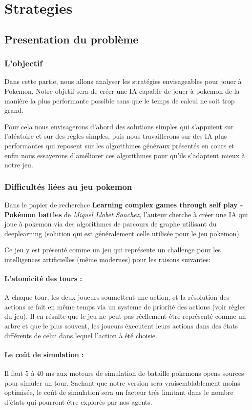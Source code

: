 \section{Strategies}
    \bigskip
	\subsection{Presentation du problème}
		\subsubsection{L'objectif}
			Dans cette partie, nous allons analyser les stratégies envisageables pour jouer à Pokemon. Notre objetif sera de créer une IA capable de jouer à pokemon de la 						manière la plus performante possible sans que le temps de calcul ne soit trop grand.

			Pour cela nous envisagerons d'abord des solutions simples qui s'appuient sur l'aléatoire et sur des règles simples, puis nous travaillerons sur des IA plus performantes 					qui reposent sur les algorithmes généraux présentés en cours et enfin nous essayerons d'améliorer ces algorithmes pour qu'ils s'adaptent mieux à notre jeu.
		\subsubsection{Difficultés liées au jeu pokemon}
			Dans le papier de recherchce \textbf{Learning complex games through self play - Pokémon battles} de \emph{Miquel Llobet Sanchez}, l'auteur cherche à créer une IA 					qui joue à pokemon via des algorithmes de parcours de graphe utilisant du deeplearning (solution qui est généralement celle utilisée pour le jeu pokemon).

			Ce jeu y est présenté comme un jeu qui représente un challenge pour les intelligences artificielles (même modernes) pour les raisons suivantes:
			\paragraph{L'atomicité des tours :}
				A chaque tour, les deux joueurs soumettent une action, et la résolution des actions se fait en même temps via un systeme de priorité des actions (voir règles 						du jeu). Il en résulte que le jeu ne peut pas réellement être représenté comme un arbre et que le plus souvent, les joueurs éxecutent leurs actions dans des états 							différents de celui dans lequel l'action à été choisie.
			\paragraph{Le coût de simulation :}
				Il faut 5 à 40 ms aux moteurs de simulation de bataille pokemons opens sources pour simuler un tour. Sachant que notre version sera vraisemblablement moins 							optimisée, le coût de simulation sera un facteur trés limitant dans le nombre d'états qui pourront être explorés par nos agents.

